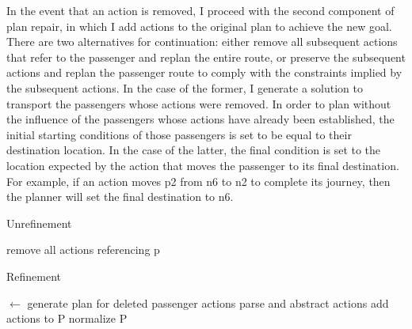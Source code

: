In the event that an action is removed, I proceed with the second component of plan repair, in which I add actions to the original plan to achieve the new goal.  There are two alternatives for continuation:  either remove all subsequent actions that refer to the passenger and replan the entire route, or preserve the subsequent actions and replan the passenger route to comply with the constraints implied by the subsequent actions.  In the case of the former, I generate a solution to transport the passengers whose actions were removed.  In order to plan without the influence of the passengers whose actions have already been established, the initial starting conditions of those passengers is set to be equal to their destination location.  In the case of the latter, the final condition is set to the location expected by the action that moves the passenger to its final destination.  For example, if an action moves p2 from n6 to n2 to complete its journey, then the planner will set the final destination to n6.


\begin{algorithm}
\caption{Unrefinement}
\label{alg:p}

\begin{algorithmic}[1] 
  
      \State remove all actions referencing p
    \EndIf
  \EndFor

\end{algorithmic}
\end{algorithm}


\begin{algorithm}
\caption{Refinement}
\label{alg:r}

\begin{algorithmic}[1] 
   $\leftarrow$ generate plan for deleted passenger actions
  \State parse and abstract {actions}
  \State add {actions} to P
  \State normalize P
\end{algorithmic}
\end{algorithm}


